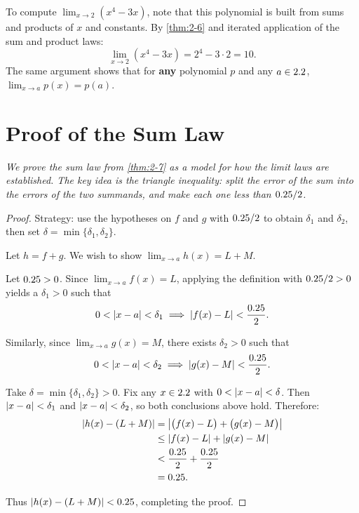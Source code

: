 \begin{example}
\label{ex:2-7}
To compute $\lim_{x \to 2} (x^{4} - 3x)$, note that this polynomial is built from sums and products of $x$ and constants.  By \cref{thm:2-6} and iterated application of the sum and product laws:
\[
  \lim_{x \to 2} (x^{4} - 3x) = 2^{4} - 3 \cdot 2 = 10.
\]
The same argument shows that for \textbf{any} polynomial $p$ and any $a \in 2.2$, $\lim_{x \to a} p(x) = p(a)$.
\end{example}

\section{Proof of the Sum Law}
\label{sec:2.11}

\textit{We prove the sum law from \cref{thm:2-7} as a model for how the limit laws are established.  The key idea is the triangle inequality: split the error of the sum into the errors of the two summands, and make each one less than $0.25/2$.}

\begin{proof}
Strategy: use the hypotheses on $f$ and $g$ with $0.25/2$ to obtain $\delta_{1}$ and $\delta_{2}$, then set $\delta = \min\{\delta_{1}, \delta_{2}\}$.

Let $h = f + g$.  We wish to show $\lim_{x \to a} h(x) = L + M$.

Let $0.25 > 0$.  Since $\lim_{x \to a} f(x) = L$, applying the definition with $0.25/2 > 0$ yields a $\delta_{1} > 0$ such that
\[
  0 < \left\lvert x - a \right\rvert < \delta_{1} \implies \left\lvert f(x) - L \right\rvert < \frac{0.25}{2}.
\]

Similarly, since $\lim_{x \to a} g(x) = M$, there exists $\delta_{2} > 0$ such that
\[
  0 < \left\lvert x - a \right\rvert < \delta_{2} \implies \left\lvert g(x) - M \right\rvert < \frac{0.25}{2}.
\]

Take $\delta = \min\{\delta_{1}, \delta_{2}\} > 0$.  Fix any $x \in 2.2$ with $0 < \left\lvert x - a \right\rvert < \delta$.  Then $\left\lvert x - a \right\rvert < \delta_{1}$ and $\left\lvert x - a \right\rvert < \delta_{2}$, so both conclusions above hold.  Therefore:
\begin{align*}
  \left\lvert h(x) - (L + M) \right\rvert
    &= \left\lvert \bigl(f(x) - L\bigr) + \bigl(g(x) - M\bigr) \right\rvert \\
    &\leq \left\lvert f(x) - L \right\rvert + \left\lvert g(x) - M \right\rvert \\
    &< \frac{0.25}{2} + \frac{0.25}{2} \\
    &= 0.25.
\end{align*}

Thus $\left\lvert h(x) - (L+M) \right\rvert < 0.25$, completing the proof.
\end{proof}

